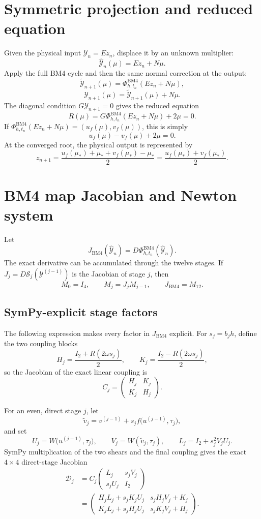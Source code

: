 \documentclass[11pt,a4paper]{article}
\newcommand{\Id}{I}
\newcommand{\Y}{\mathcal{Y}}
\newcommand{\PhiBM}{\Phi^{\mathrm{BM4}}_{h,t_n}}
\begin{document}
\section{Symmetric projection and reduced equation}

Given the physical input $\Y_n=Ez_n$, displace it by an unknown multiplier:
\[
 \widehat{\Y}_n(\mu)=Ez_n+N\mu.
\]
Apply the full BM4 cycle and then the same normal correction at the output:
\[
 \widetilde{\Y}_{n+1}(\mu)
 =\PhiBM(Ez_n+N\mu),
\]
\[
 \Y_{n+1}(\mu)
 =\widetilde{\Y}_{n+1}(\mu)+N\mu.
\]
The diagonal condition $G\Y_{n+1}=0$ gives the reduced equation
\[
 \boxed{
 R(\mu)
 =G\PhiBM(Ez_n+N\mu)+2\mu=0.
 } \tag{1}
\]
If $\PhiBM(Ez_n+N\mu)=(u_f(\mu),v_f(\mu))$, this is simply
\[
 u_f(\mu)-v_f(\mu)+2\mu=0.
\]
At the converged root, the physical output is represented by
\[
 \boxed{
 z_{n+1}=\frac{u_f(\mu_*)+\mu_*+v_f(\mu_*)-\mu_*}{2}
 =\frac{u_f(\mu_*)+v_f(\mu_*)}{2}.
 } \tag{2}
\]

\section{BM4 map Jacobian and Newton system}

Let
\[
 J_{\mathrm{BM4}}(\widehat{\Y}_n)
 =D\PhiBM(\widehat{\Y}_n).
\]
The exact derivative can be accumulated through the twelve stages.  If
$J_j=D\mathcal S_j(\Y^{(j-1)})$ is the Jacobian of stage $j$, then
\[
 M_0=\Id_4,
 \qquad
 M_j=J_jM_{j-1},
 \qquad
 J_{\mathrm{BM4}}=M_{12}.
\]

\subsection*{SymPy-explicit stage factors}

The following expression makes every factor in $J_{\mathrm{BM4}}$ explicit.
For $s_j=b_jh$, define the two coupling blocks
\[
 H_j=\frac{\Id_2+R(2\omega s_j)}{2},
 \qquad
 K_j=\frac{\Id_2-R(2\omega s_j)}{2},
\]
so the Jacobian of the exact linear coupling is
\[
 C_j=
 \begin{pmatrix}
  H_j&K_j\\
  K_j&H_j
 \end{pmatrix}.
\]

For an even, direct stage $j$, let
\[
 \widetilde v_j
 =v^{(j-1)}+s_jf\bigl(u^{(j-1)},\tau_j\bigr),
\]
and set
\[
 U_j=W\bigl(u^{(j-1)},\tau_j\bigr),
 \qquad
 V_j=W(\widetilde v_j,\tau_j),
 \qquad
 L_j=\Id_2+s_j^2V_jU_j.
\]
SymPy multiplication of the two shears and the final coupling gives the exact
$4\times4$ direct-stage Jacobian
\[
 \boxed{
 \begin{aligned}
 \mathcal D_j
 &=C_j
 \begin{pmatrix}
  L_j&s_jV_j\\
  s_jU_j&\Id_2
 \end{pmatrix}\\[2mm]
 &=
 \begin{pmatrix}
  H_jL_j+s_jK_jU_j&s_jH_jV_j+K_j\\
  K_jL_j+s_jH_jU_j&s_jK_jV_j+H_j
 \end{pmatrix}.
 \end{aligned}
 }
\]
\end{document}
